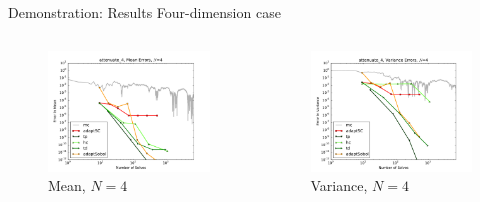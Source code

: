 \documentclass[t,9pt,svgnames]{beamer}
\begin{document}
\begin{frame}{Demonstration: Results}
  Four-dimension case
  \begin{columns}
    \begin{column}{0.5\textwidth}
      \begin{figure}
        \centering
        \includegraphics[width=\linewidth]{./attenuate/attenuate_4_mean_errs}
        \caption{Mean, $N=4$}
      \end{figure}
    \end{column}
    \begin{column}{0.5\textwidth}
      \begin{figure}
        \centering
        \includegraphics[width=\linewidth]{./attenuate/attenuate_4_variance_errs}
        \caption{Variance, $N=4$}
      \end{figure}
    \end{column}
  \end{columns}
\end{frame}
\end{document}
